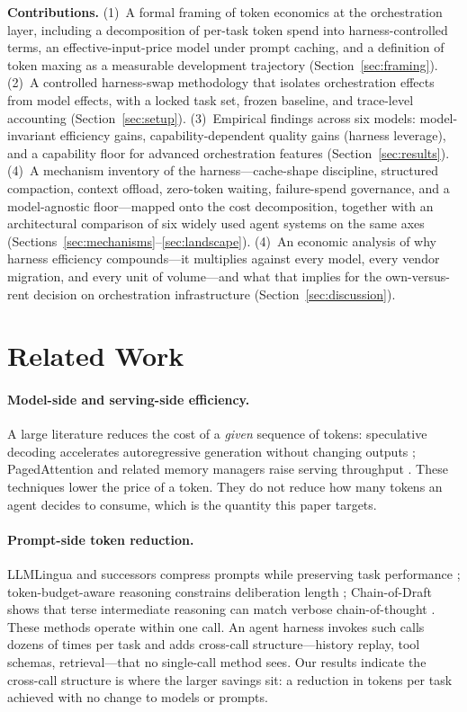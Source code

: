 \documentclass[11pt]{article}
\newcommand{\NM}{six}                   %
\begin{document}
\medskip
\noindent\textbf{Contributions.}
(1)~A formal framing of token economics at the orchestration layer, including a decomposition of per-task token spend into harness-controlled terms, an effective-input-price model under prompt caching, and a definition of token maxing as a measurable development trajectory (Section~\ref{sec:framing}).
(2)~A controlled harness-swap methodology that isolates orchestration effects from model effects, with a locked task set, frozen baseline, and trace-level accounting (Section~\ref{sec:setup}).
(3)~Empirical findings across \NM{} models: model-invariant efficiency gains, capability-dependent quality gains (harness leverage), and a capability floor for advanced orchestration features (Section~\ref{sec:results}).
(4)~A mechanism inventory of the harness---cache-shape discipline, structured compaction, context offload, zero-token waiting, failure-spend governance, and a model-agnostic floor---mapped onto the cost decomposition, together with an architectural comparison of six widely used agent systems on the same axes (Sections~\ref{sec:mechanisms}--\ref{sec:landscape}).
(4)~An economic analysis of why harness efficiency compounds---it multiplies against every model, every vendor migration, and every unit of volume---and what that implies for the own-versus-rent decision on orchestration infrastructure (Section~\ref{sec:discussion}).

\section{Related Work}
\label{sec:related}

\paragraph{Model-side and serving-side efficiency.} A large literature reduces the cost of a \emph{given} sequence of tokens: speculative decoding accelerates autoregressive generation without changing outputs \cite{spec}; PagedAttention and related memory managers raise serving throughput \cite{vllm}. These techniques lower the price of a token. They do not reduce how many tokens an agent decides to consume, which is the quantity this paper targets.

\paragraph{Prompt-side token reduction.} LLMLingua and successors compress prompts while preserving task performance \cite{llmlingua}; token-budget-aware reasoning constrains deliberation length \cite{tale}; Chain-of-Draft shows that terse intermediate reasoning can match verbose chain-of-thought \cite{cod,cot}. These methods operate within one call. An agent harness invokes such calls dozens of times per task and adds cross-call structure---history replay, tool schemas, retrieval---that no single-call method sees. Our results indicate the cross-call structure is where the larger savings sit: a \TokD{} reduction in tokens per task achieved with no change to models or prompts.
\end{document}
